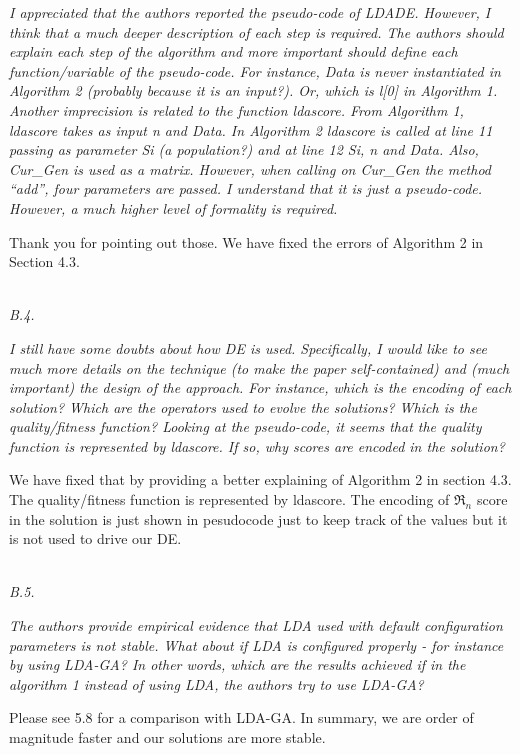 \documentclass[conference]{IEEEtran}
\begin{document}
\textit{I appreciated that the authors reported the pseudo-code of LDADE. However, I think that a much deeper description of each step is required. The authors should explain each step of the algorithm and more important should define each function/variable of the pseudo-code. For instance, Data is never instantiated in Algorithm 2 (probably because it is an input?). Or, which is l[0] in Algorithm 1. Another imprecision is related to the function ldascore. From Algorithm 1, ldascore takes as input n and Data. In Algorithm 2 ldascore is called at line 11 passing as parameter Si (a population?) and at line 12 Si, n and Data. Also, Cur\_Gen is used as a matrix. However, when calling on Cur\_Gen the method ``add'', four parameters are passed. I understand that it is just a pseudo-code. However, a much higher level of formality is required.\\}

Thank you for pointing out those. We have fixed the errors of Algorithm 2 in Section 4.3. 

\noindent
\textit{\\B.4.} 

\textit{I still have some doubts about how DE is used. Specifically, I would like to see much more details on the technique (to make the paper self-contained) and (much important) the design of the approach. For instance, which is the encoding of each solution? Which are the operators used to evolve the solutions? Which is the quality/fitness function? Looking at the pseudo-code, it seems that the quality function is represented by ldascore. If so, why scores are encoded in the solution?\\} 

We have fixed that by providing a better explaining of Algorithm 2 in section 4.3. The quality/fitness function is represented by ldascore. The encoding of $\Re_n$ score in the solution is just shown in pesudocode just to keep track of the values but it is not used to drive our DE. 

\noindent
\textit{\\B.5.}  

\textit{The authors provide empirical evidence that LDA used with default configuration parameters is not stable. What about if LDA is configured properly - for instance by using LDA-GA? In other words, which are the results achieved if in the algorithm 1 instead of using LDA, the authors try to use LDA-GA?\\}

Please see 5.8 for a comparison with LDA-GA. In summary, we are order of magnitude faster and our solutions are more stable.
\end{document}
